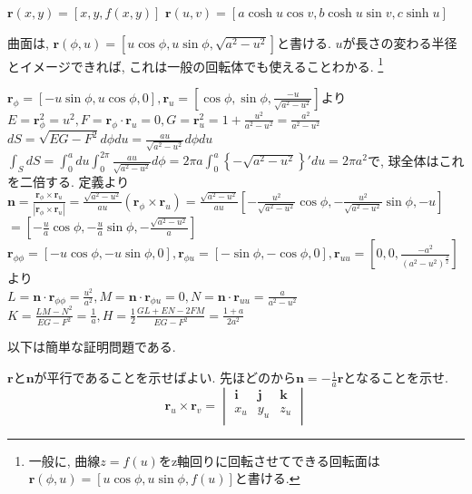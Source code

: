 \documentclass[a4j,dvipdfmx]{jsarticle}
\begin{document}
\begin{qparts}
\begin{qlist}
                \qitem $\bm{r}(x,y)=[x,y,f(x,y)]$
                \qitem $\bm{r}(u,v) = [a\cosh u\cos v,b\cosh u\sin v,c\sinh u]$
            \end{qlist}
            \qpart 曲面は, $\bm{r}(\phi,u)=[u\cos\phi,u\sin\phi,\sqrt{a^2-u^2}]$と書ける. $u$が長さの変わる半径とイメージできれば, これは一般の回転体でも使えることわかる. \footnote{一般に, 曲線$z=f(u)$をz軸回りに回転させてできる回転面は$\bm{r}(\phi,u)=[u\cos\phi,u\sin\phi,f(u)]$と書ける.}
            \begin{qlist}
                \qitem $\bm{r}_\phi=[-u\sin\phi,u\cos\phi,0],\bm{r}_u=[\cos\phi,\sin\phi,\frac{-u}{\sqrt{a^2-u^2}}]$より\\
                $E=\bm{r}_\phi^2=u^2,F=\bm{r}_\phi\cdot\bm{r}_u=0,G=\bm{r}_u^2=1+\frac{u^2}{a^2-u^2}=\frac{a^2}{a^2-u^2}$
                \qitem $dS=\sqrt{EG-F^2}d\phi du=\frac{au}{\sqrt{a^2-u^2}}d\phi du$
                \qitem $\int_S dS=\int_0^a du\int_0^{2\pi} \frac{au}{\sqrt{a^2-u^2}}d\phi=2\pi a\int_{0}^{a}\left\{-\sqrt{a^2-u^2}\right\}'du=2\pi a^2$で, 球全体はこれを二倍する.
                \qitem 定義より$\bm{n}=\frac{\bm{r}_\phi\times\bm{r}_u}{|\bm{r}_\phi\times\bm{r}_u|}=\frac{\sqrt{a^2-u^2}}{au}(\bm{r}_\phi\times\bm{r}_u)=\frac{\sqrt{a^2-u^2}}{au}[-\frac{u^2}{\sqrt{a^2-u^2}}\cos\phi,-\frac{u^2}{\sqrt{a^2-u^2}}\sin\phi,-u]$\\
                $=[-\frac{u}{a}\cos\phi,-\frac{u}{a}\sin\phi,-\frac{\sqrt{a^2-u^2}}{a}]$ \label{q:円の法線}
                \qitem $\bm{r}_{\phi\phi}=[-u\cos\phi,-u\sin\phi,0],\bm{r}_{\phi u}=[-\sin\phi,-\cos\phi,0],\bm{r}_{uu}=\left[0,0,\frac{-a^2}{(a^2-u^2)^{\frac{3}{2}}}\right]$より\\
                $L=\bm{n}\cdot\bm{r}_{\phi\phi}=\frac{u^2}{a^2},M=\bm{n}\cdot\bm{r}_{\phi u}=0,N=\bm{n}\cdot\bm{r}_{uu}=\frac{a}{a^2-u^2}$
                \qitem $K=\frac{LM-N^2}{EG-F^2}=\frac{1}{a},H=\frac{1}{2}\frac{GL+EN-2FM}{EG-F^2}=\frac{1+a}{2a^2}$
            \end{qlist}
            \qpart 以下は簡単な証明問題である.
            \begin{qlist}
                \qitem $\bm{r}$と$\bm{n}$が平行であることを示せばよい. 先ほどのから$\bm{n}=-\frac{1}{a}\bm{r}$となることを示せ.
                \qitem 
                \begin{equation*}
                    \bm{r}_u\times\bm{r}_v = \begin{vmatrix}
                        \bm{i} & \bm{j} & \bm{k} \\
                        x_u & y_u & z_u \\

\end{vmatrix}
\end{equation*}
\end{qlist}
\end{qparts}
\end{document}
